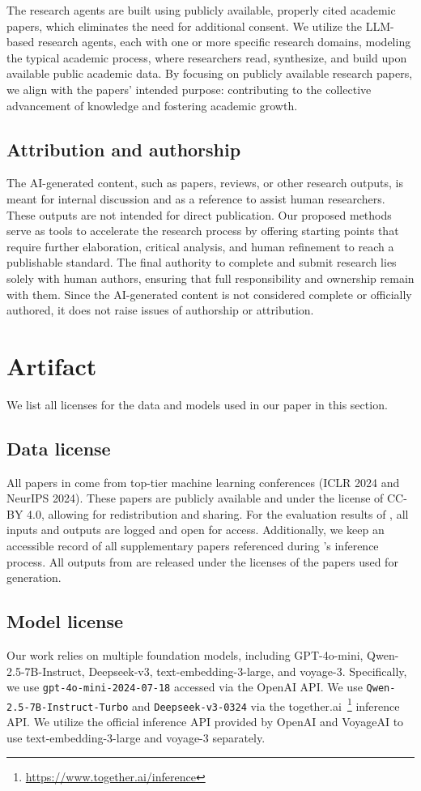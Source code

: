 The research agents are built using publicly available, properly cited academic papers, which eliminates the need for additional consent. We utilize the LLM-based research agents, each with one or more specific research domains, modeling the typical academic process, where researchers read, synthesize, and build upon available public academic data. By focusing on publicly available research papers, we align with the papers' intended purpose: contributing to the collective advancement of knowledge and fostering academic growth.

\subsection{Attribution and authorship}
The AI-generated content, such as papers, reviews, or other research outputs, is meant for internal discussion and as a reference to assist human researchers. These outputs are not intended for direct publication. Our proposed methods serve as tools to accelerate the research process by offering starting points that require further elaboration, critical analysis, and human refinement to reach a publishable standard. The final authority to complete and submit research lies solely with human authors, ensuring that full responsibility and ownership remain with them. Since the AI-generated content is not considered complete or officially authored, it does not raise issues of authorship or attribution.

\section{Artifact}
We list all licenses for the data and models used in our paper in this section.
\subsection{Data license}
All papers in \benchname come from top-tier machine learning conferences (ICLR 2024 and NeurIPS 2024). These papers are publicly available and under the license of CC-BY 4.0, allowing for redistribution and sharing. For the evaluation results of \benchname, all inputs and outputs are logged and open for access. Additionally, we keep an accessible record of all supplementary papers referenced during \envname's inference process. All outputs from \envname are released under the licenses of the papers used for generation.

\subsection{Model license}
Our work relies on multiple foundation models, including GPT-4o-mini, Qwen-2.5-7B-Instruct, Deepseek-v3, text-embedding-3-large, and voyage-3. Specifically, we use \texttt{gpt-4o-mini-2024-07-18} accessed via the OpenAI API. We use \texttt{Qwen-2.5-7B-Instruct-Turbo} and \texttt{Deepseek-v3-0324} via the together.ai~\footnote{\url{https://www.together.ai/inference}} inference API. We utilize the official inference API provided by OpenAI and VoyageAI to use text-embedding-3-large and voyage-3 separately.

